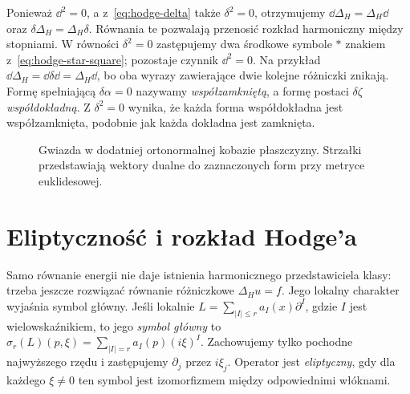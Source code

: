 Ponieważ $\dd^2=0$, a z~\eqref{eq:hodge-delta} także
$\delta^2=0$, otrzymujemy $\dd\Delta_H=\Delta_H\dd$
oraz $\delta\Delta_H=\Delta_H\delta$. Równania te
pozwalają przenosić rozkład harmoniczny między stopniami.
W równości $\delta^2=0$ zastępujemy dwa środkowe symbole $*$
znakiem z~\eqref{eq:hodge-star-square}; pozostaje czynnik $\dd^2=0$.
Na przykład $\dd\Delta_H=\dd\delta\dd=\Delta_H\dd$,
bo oba wyrazy zawierające dwie kolejne różniczki znikają.
Formę spełniającą $\delta\alpha=0$ nazywamy
\emph{współzamkniętą}, a formę postaci $\delta\zeta$
\emph{współdokładną}. Z $\delta^2=0$ wynika,
że każda forma współdokładna jest współzamknięta,
podobnie jak każda dokładna jest zamknięta.

\begin{figure}[H]
\centering
{}
\caption{Gwiazda w dodatniej ortonormalnej kobazie płaszczyzny.
Strzałki przedstawiają wektory dualne do zaznaczonych form
przy metryce euklidesowej.}
\label{fig:hodge-gwiazda-plaszczyzna}
\end{figure}

\section{Eliptyczność i rozkład Hodge'a}
\label{sec:hodge-rozklad}

Samo równanie energii nie daje istnienia harmonicznego
przedstawiciela klasy: trzeba jeszcze rozwiązać równanie
różniczkowe $\Delta_Hu=f$. Jego lokalny charakter wyjaśnia
symbol główny.
Jeśli lokalnie $L=\sum_{|I|\leq r}a_I(x)\partial^I$,
gdzie $I$ jest wielowskaźnikiem, to jego
\emph{symbol główny} to
$\sigma_r(L)(p,\xi)=\sum_{|I|=r}a_I(p)(i\xi)^I$.
Zachowujemy tylko pochodne najwyższego rzędu
i zastępujemy $\partial_j$ przez $i\xi_j$.
Operator jest \emph{eliptyczny}, gdy dla każdego $\xi\ne0$
ten symbol jest izomorfizmem między odpowiednimi włóknami.

